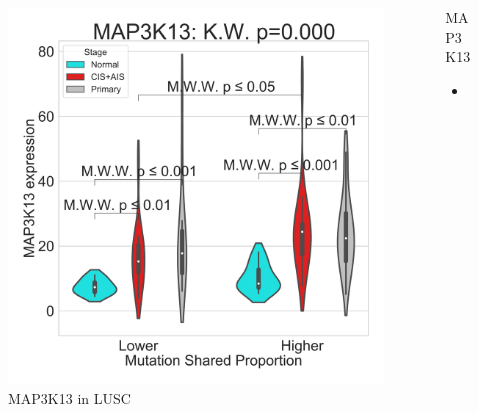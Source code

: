 \documentclass{beamer}
\begin{document}
\begin{frame}[allowframebreaks]
                    \begin{columns}
                        \begin{column}{0.4 \textwidth}
                            \begin{figure}
                                \includegraphics[width=\linewidth]{figures/DEG/Violin/STAR.TPM.SQC.MSP-Median.violin/Mutation Shared Proportion_MAP3K13.pdf}
                                \caption{MAP3K13 in LUSC}
                            \end{figure}
                        \end{column}
                        \begin{column}{0.55 \textwidth}
                            \begin{block}{MAP3K13}
                                \begin{itemize}
                                    \item
                                \end{itemize}
                            \end{block}
                        \end{column}
                    \end{columns}


\end{frame}
\end{document}

